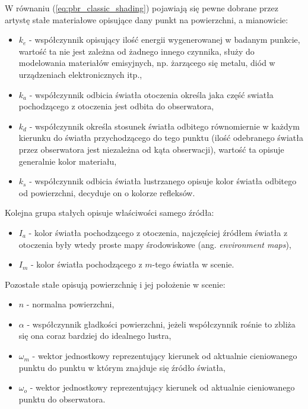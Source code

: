 \documentclass[../main.tex]{subfiles}
\begin{document}
W równaniu (\ref{eq:pbr_classic_shading}) pojawiają się pewne dobrane przez artystę stałe materiałowe opisujące dany punkt na powierzchni, a mianowicie:

\begin{itemize}

\item $k_e$ - współczynnik opisujący ilość energii wygenerowanej w badanym punkcie, wartość ta nie jest zależna od żadnego innego czynnika, służy do modelowania materiałów emisyjnych, np. żarzącego się metalu, diód w urządzeniach elektronicznych itp.,

\item $k_a$ - współczynnik odbicia światła otoczenia określa jaka część swiatła pochodzącego z otoczenia jest odbita do obserwatora, 

\item $k_d$ - współczynnik określa stosunek światła odbitego równomiernie w każdym kierunku do światła przychodzącego do tego punktu (ilość odebranego światła przez obserwatora jest niezależna od kąta obserwacji), wartość ta opisuje generalnie kolor materiału,

\item $k_s$ - współczynnik odbicia światła lustrzanego opisuje kolor światła odbitego od powierzchni, decyduje on o kolorze refleksów.

\end{itemize}

\noindent Kolejna grupa stałych opisuje właściwości samego źródła:

\begin{itemize}
    \item $I_a$ - kolor światła pochodzącego z otoczenia, najczęściej źródłem światła z otoczenia były wtedy proste mapy środowiskowe (ang. \textit{environment maps}),
    \item $I_m$ - kolor światła pochodzącego z $m$-tego światła w scenie.
\end{itemize}

\noindent Pozostałe stałe opisują powierzchnię i jej położenie w scenie:

\begin{itemize}
    \item $n$ - normalna powierzchni,
    \item $\alpha$ - współczynnik gładkości powierzchni, jeżeli współczynnik rośnie to zbliża się ona coraz bardziej do idealnego lustra,
    \item $\omega_m$ - wektor jednostkowy reprezentujący kierunek od aktualnie cieniowanego punktu do punktu w którym znajduje się źródło światła,
    \item $\omega_o$ - wektor jednostkowy reprezentujący kierunek od aktualnie cieniowanego punktu do obserwatora.
\end{itemize}
\end{document}
